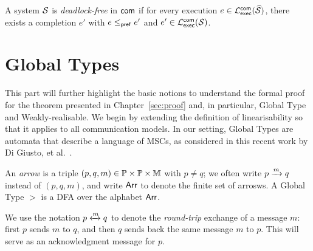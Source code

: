 \bigskip

\begin{definition}\label{def:deadlock-free}
A system $\cfsms$ is \emph{deadlock-free} in $\acommunicationmodel$  
if for every execution 
$e \in \executionsofcfsms{\acceptcompletion{\cfsms}}{\acommunicationmodel}$,  
there exists a completion $e'$ with $e \prefixorder e'$ and  
$e' \in \executionsofcfsms{\cfsms}{\acommunicationmodel}$.  
\end{definition}


\section{Global Types}
This part will further highlight the basic notions to understand the formal proof 
for the theorem presented in Chapter~\ref{sec:proof} and, in particular, Global Type
and Weakly-realisable. We begin by extending the definition of linearisability so 
that it applies to all communication models.
In our setting, Global Types are automata that describe a language of MSCs, 
as considered in this recent work by Di Giusto, et al.~\cite{di2025realisability}.



\bigskip

\begin{definition}
	An \emph{arrow} is a triple $(p,q,m)\in\Procs\times\Procs\times\Messages$ 
	with $p\ne q$; we often write $\marrow{p}{q}{m}$ instead of $(p,q,m)$, and 
	write $\labelalphabet$ to denote the finite set of arrosws.
	A Global Type $\gt$ is a DFA over the alphabet $\labelalphabet$.
\end{definition}

We use the notation $p \xleftrightarrow{m} q$ to denote the
\emph{round-trip} exchange of a message $m$: first $p$ sends $m$
to $q$, and then $q$ sends back the same message $m$ to $p$.
This will serve as an acknowledgment message for $p$.

